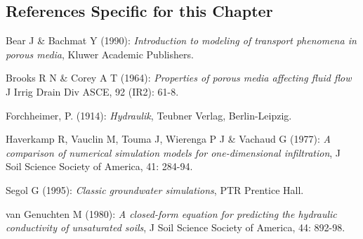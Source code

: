 

\subsection{References Specific for this Chapter}

\vspace{5mm}

Bear J \& Bachmat Y (1990): {\it Introduction to modeling of
transport phenomena in porous media}, Kluwer Academic Publishers.

\vspace{5mm}

Brooks R N \& Corey A T (1964): {\it Properties of porous media
affecting fluid flow} J Irrig Drain Div ASCE, 92 (IR2): 61-8.

\vspace{5mm}

Forchheimer, P. (1914): {\it Hydraulik}, Teubner Verlag,
Berlin-Leipzig.

\vspace{5mm}

Haverkamp R, Vauclin M, Touma J, Wierenga P J \& Vachaud G (1977):
{\it A comparison of numerical simulation models for
one-dimensional infiltration}, J Soil Science Society of America,
41: 284-94.


Segol G (1995): {\it Classic groundwater simulations}, PTR
Prentice Hall.

\vspace{5mm}

van Genuchten M (1980): {\it A closed-form equation for predicting
the hydraulic conductivity of unsaturated soils}, J Soil Science
Society of America, 44: 892-98.
